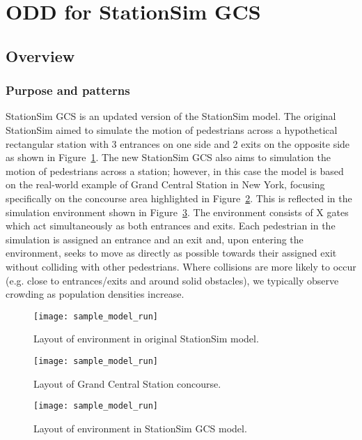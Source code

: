 \section{ODD for StationSim GCS}\label{sec:stationsim}

\subsection{Overview}\label{sub:stationsim:overview}

\subsubsection{Purpose and patterns}\label{subs:stationsim:overview:purpose}

StationSim GCS is an updated version of the StationSim model.
The original StationSim aimed to simulate the motion of pedestrians across a
hypothetical rectangular station with 3 entrances on one side and 2 exits on the
opposite side as shown in Figure~\ref{fig:stationsim_env}.
The new StationSim GCS also aims to simulation the motion of pedestrians across
a station; however, in this case the model is based on the real-world example of
Grand Central Station in New York, focusing specifically on the concourse area
highlighted in Figure~\ref{fig:gcs_concourse}.
This is reflected in the simulation environment shown in
Figure~\ref{fig:stationsim_gcs_env}.
The environment consists of X gates which act simultaneously as both entrances
and exits.
Each pedestrian in the simulation is assigned an entrance and an exit and, upon
entering the environment, seeks to move as directly as possible towards their
assigned exit without colliding with other pedestrians.
Where collisions are more likely to occur (e.g. close to entrances/exits and
around solid obstacles), we typically observe crowding as population densities
increase.

\begin{figure}[h]
    \centering
    \texttt{[image: sample\_model\_run]}
    \caption{Layout of environment in original StationSim
    model.}\label{fig:stationsim_env}
\end{figure}

\begin{figure}[h]
    \centering
    \texttt{[image: sample\_model\_run]}
    \caption{Layout of Grand Central Station
    concourse.}\label{fig:gcs_concourse}
\end{figure}

\begin{figure}[h]
    \centering
    \texttt{[image: sample\_model\_run]}
    \caption{Layout of environment in StationSim GCS
    model.}\label{fig:stationsim_gcs_env}
\end{figure}

